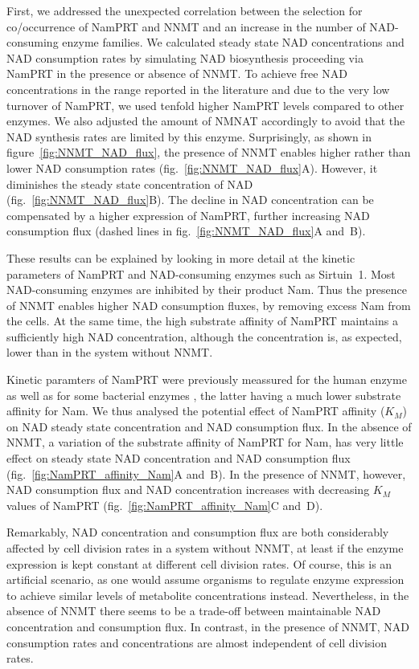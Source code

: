 First, we addressed the unexpected correlation between the selection for co\-/occurrence of NamPRT and NNMT and an increase in the number of NAD-consuming enzyme families. We calculated steady state NAD concentrations and NAD consumption rates by simulating NAD biosynthesis proceeding via NamPRT in the presence or absence of NNMT. To achieve free NAD concentrations in the range reported in the literature and due to the very low turnover of NamPRT, we used tenfold higher NamPRT levels compared to other enzymes. We also adjusted the amount of NMNAT accordingly to avoid that the NAD synthesis rates are limited by this enzyme. Surprisingly, as shown in figure~\ref{fig:NNMT_NAD_flux}, the presence of NNMT enables higher rather than lower NAD consumption rates (fig.~\ref{fig:NNMT_NAD_flux}A). However, it diminishes the steady state concentration of NAD (fig.~\ref{fig:NNMT_NAD_flux}B). The decline in NAD concentration can be compensated by a higher expression of NamPRT, further increasing NAD consumption flux (dashed lines in fig.~\ref{fig:NNMT_NAD_flux}A and~B).

These results can be explained by looking in more detail at the kinetic parameters of NamPRT and NAD-consuming enzymes such as Sirtuin~1. Most NAD-consuming enzymes are inhibited by their product Nam. Thus the presence of NNMT enables higher NAD consumption fluxes, by removing excess Nam from the cells. At the same time, the high substrate affinity of NamPRT maintains a sufficiently high NAD concentration, although the concentration is, as expected, lower than in the system without NNMT.

Kinetic paramters of NamPRT were previously meassured for the human enzyme \citep{Burgos2008} as well as for some bacterial enzymes \citep{Sorci2010}, the latter having a much lower substrate affinity for Nam. We thus analysed the potential effect of NamPRT affinity ($K_{M}$) on NAD steady state concentration and NAD consumption flux. In the absence of NNMT, a variation of the substrate affinity of NamPRT for Nam, has very little effect on steady state NAD concentration and NAD consumption flux (fig.~\ref{fig:NamPRT_affinity_Nam}A and~B). In the presence of NNMT, however, NAD consumption flux and NAD concentration increases with decreasing $K_{M}$ values of NamPRT (fig.~\ref{fig:NamPRT_affinity_Nam}C and~D).

Remarkably, NAD concentration and consumption flux are both considerably affected by cell division rates in a system without NNMT, at least if the enzyme expression is kept constant at different cell division rates. Of course, this is an artificial scenario, as one would assume organisms to regulate enzyme expression to achieve similar levels of metabolite concentrations instead. Nevertheless, in the absence of NNMT there seems to be a trade-off between maintainable NAD concentration and consumption flux. In contrast, in the presence of NNMT, NAD consumption rates and concentrations are almost independent of cell division rates.

